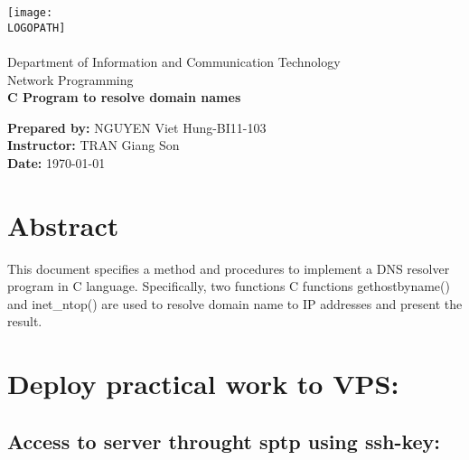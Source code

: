 \documentclass[12pt]{article}
\def \LOGOPATH {logo/logo-usth.png}
\def \DEPARTEMENT {Department of Information and Communication Technology}
\def \COURSENAME {Network Programming}
\def \REPORTTITLE {C Program to resolve domain names}
\def \STUDENTNAME {NGUYEN Viet Hung}
\def \STUDENTID {BI11-103}
\def \INSTRUCTOR {TRAN Giang Son}
\begin{document}

\begin{titlepage}
    \vfill
    \begin{center}
        \texttt{[image: \\LOGOPATH]} \\
        \hfill \\
        \Large{\DEPARTEMENT} \\
        \Large{\COURSENAME} \\
        \vfill
        \textbf{\LARGE{\REPORTTITLE}}
    \end{center}
    \vfill
    \begin{flushleft}
        \Large{\textbf{Prepared by:} \STUDENTNAME\;-\;\STUDENTID} \\
        \Large{\textbf{Instructor:} \INSTRUCTOR} \\
        \Large{\textbf{Date:} \today}
    \end{flushleft}
    \vfill
\end{titlepage}

{
\section*{\centering Abstract} 
This document specifies a method and procedures to implement a DNS resolver program in C language. Specifically, two functions C functions gethostbyname() and inet\_ntop() are used to resolve domain name to IP addresses and present the result.
\clearpage
}


\tableofcontents
\clearpage

\setlength{\parskip}{\baselineskip}%



\section{Deploy practical work to VPS:}

\subsection{Access to server throught sptp using ssh-key:}
\end{document}
